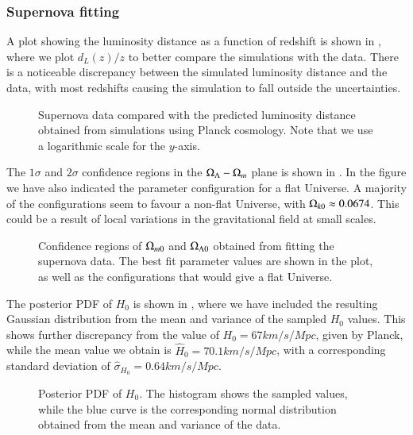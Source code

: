 \subsubsection{Supernova fitting}


A plot showing the luminosity distance as a function of redshift is shown in , where we plot $d_L(z)/z$ to better compare the simulations with the data. There is a noticeable discrepancy between the simulated luminosity distance and the data, with most redshifts causing the simulation to fall outside the uncertainties.       
\begin{figure}[ht!]
    \caption{Supernova data compared with the predicted luminosity distance obtained from simulations using Planck cosmology. Note that we use a logarithmic scale for the $y$-axis. }
    \label{fig:M1:results:dL_z_compare_planck}
\end{figure}

The $1\sigma$ and $2\sigma$ confidence regions in the $\Omega_{\Lambda}-\Omega_{m}$ plane is shown in . In the figure we have also indicated the parameter configuration for a flat Universe. A majority of the configurations seem to favour a non-flat Universe, with $\Omega_{k0}\approx 0.0674$. This could be a result of local variations in the gravitational field at small scales.      
\begin{figure}[ht!]
    \caption{Confidence regions of $\Omega_{m0}$ and $\Omega_{\Lambda 0}$ obtained from fitting the supernova data. The best fit parameter values are shown in the plot, as well as the configurations that would give a flat Universe.}
    \label{fig:M1:results:mcmc_supernova_fit_Nburn1000}
\end{figure}

The posterior PDF of $H_0$ is shown in , where we have included the resulting Gaussian distribution from the mean and variance of the sampled $H_0$ values. This shows further discrepancy from the value of $H_0=67\unit{km/s/Mpc}$, given by Planck, while the mean value we obtain is $\hat{H}_0=70.1\unit{km/s/Mpc}$, with a corresponding standard deviation of $\hat{\sigma}_{H_0}=0.64\unit{km/s/Mpc}$.       
\begin{figure}[ht!]
    \caption{Posterior PDF of $H_0$. The histogram shows the sampled values, while the blue curve is the corresponding normal distribution obtained from the mean and variance of the data.}
    \label{fig:M1:results:H0_pdf_Nburn1000}
\end{figure}


